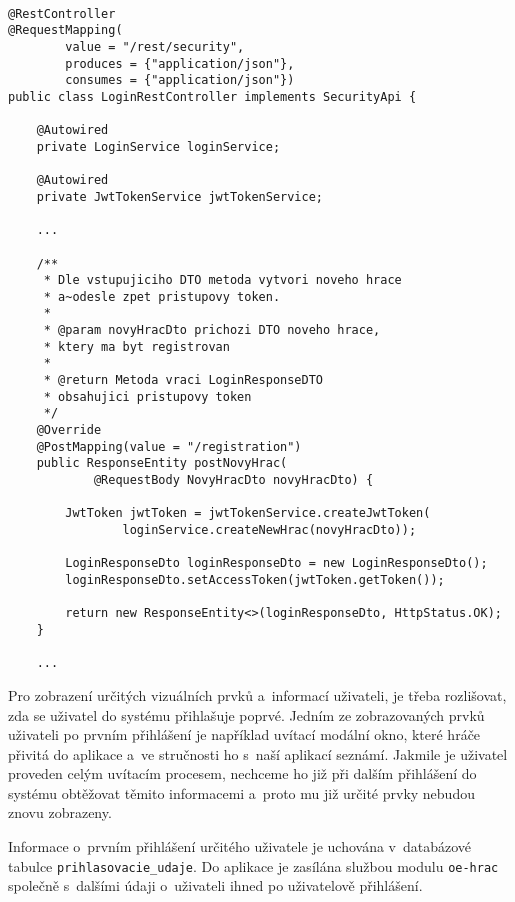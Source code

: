\documentclass[12pt]{article}
\begin{document}
{\clearpage

\begin{lstlisting}

@RestController
@RequestMapping(
        value = "/rest/security",
        produces = {"application/json"},
        consumes = {"application/json"})
public class LoginRestController implements SecurityApi {
    
    @Autowired
    private LoginService loginService;
    
    @Autowired
    private JwtTokenService jwtTokenService;
    
    ...

    /**
     * Dle vstupujiciho DTO metoda vytvori noveho hrace
     * a~odesle zpet pristupovy token.
     *
     * @param novyHracDto prichozi DTO noveho hrace,
     * ktery ma byt registrovan
     *                    
     * @return Metoda vraci LoginResponseDTO
     * obsahujici pristupovy token
     */
    @Override
    @PostMapping(value = "/registration")
    public ResponseEntity postNovyHrac(
            @RequestBody NovyHracDto novyHracDto) {
             
        JwtToken jwtToken = jwtTokenService.createJwtToken(
                loginService.createNewHrac(novyHracDto));
                
        LoginResponseDto loginResponseDto = new LoginResponseDto();
        loginResponseDto.setAccessToken(jwtToken.getToken());

        return new ResponseEntity<>(loginResponseDto, HttpStatus.OK);      
    }
    
    ...

\end{lstlisting}

\clearpage



Pro zobrazení určitých vizuálních prvků a~informací uživateli, je třeba rozlišovat,
zda se uživatel do systému přihlašuje poprvé. Jedním ze zobrazovaných prvků uživateli po prvním přihlášení je například uvítací modální okno,
které hráče přivitá do aplikace a~ve stručnosti ho s~naší aplikací seznámí.
Jakmile je uživatel proveden celým uvítacím procesem, nechceme ho již při dalším přihlášení do systému
obtěžovat těmito informacemi a~proto mu již určité prvky nebudou znovu zobrazeny.

Informace o~prvním přihlášení určitého uživatele je uchována v~databázové tabulce \texttt{prihlasovacie\_udaje}.
Do aplikace je zasílána službou modulu \texttt{oe-hrac} společně s~dalšími údaji o~uživateli ihned po uživatelově přihlášení.

}
\end{document}
